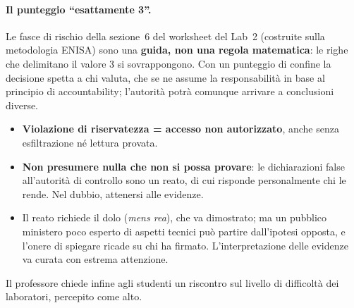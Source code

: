 \paragraph{Il punteggio ``esattamente 3''.} Le fasce di rischio della sezione~6 del worksheet del Lab~2 (costruite sulla metodologia ENISA)
sono una \textbf{guida, non una regola matematica}: le righe che delimitano il valore 3 si sovrappongono.
Con un punteggio di confine la decisione spetta a chi valuta, che se ne assume la responsabilità in base al
principio di accountability; l'autorità potrà comunque arrivare a conclusioni diverse.

\begin{esame}
\begin{itemize}
  \item \textbf{Violazione di riservatezza = accesso non autorizzato}, anche senza esfiltrazione né
    lettura provata.
  \item \textbf{Non presumere nulla che non si possa provare}: le dichiarazioni false all'autorità di
    controllo sono un reato, di cui risponde personalmente chi le rende. Nel dubbio, attenersi alle
    evidenze.
  \item Il reato richiede il dolo (\emph{mens rea}), che va dimostrato; ma un pubblico ministero poco
    esperto di aspetti tecnici può partire dall'ipotesi opposta, e l'onere di spiegare ricade su chi ha
    firmato. L'interpretazione delle evidenze va curata con estrema attenzione.
\end{itemize}
\end{esame}

\noindent Il professore chiede infine agli studenti un riscontro sul livello di difficoltà dei
laboratori, percepito come alto.

